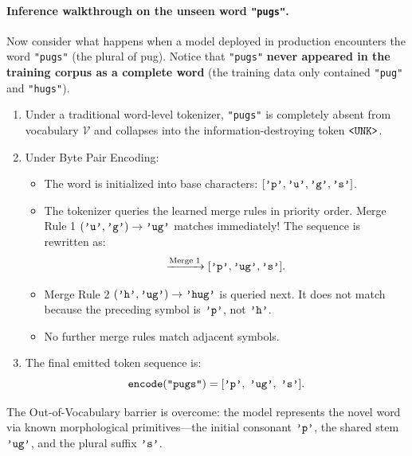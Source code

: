 \documentclass[../../main.tex]{subfiles}
\begin{document}
\paragraph{Inference walkthrough on the unseen word \texttt{"pugs"}.}
Now consider what happens when a model deployed in production encounters the word \texttt{"pugs"} (the plural of pug).
Notice that \texttt{"pugs"} \textbf{never appeared in the training corpus as a complete word} (the training data only contained \texttt{"pug"} and \texttt{"hugs"}).
\begin{enumerate}
    \item Under a traditional word-level tokenizer, \texttt{"pugs"} is completely absent from vocabulary $\mathcal{V}$ and collapses into the information-destroying token $\text{\texttt{<UNK>}}$.
    \item Under Byte Pair Encoding:
    \begin{itemize}
        \item The word is initialized into base characters: $[\text{\texttt{'p'}}, \text{\texttt{'u'}}, \text{\texttt{'g'}}, \text{\texttt{'s'}}]$.
        \item The tokenizer queries the learned merge rules in priority order. Merge Rule 1 $(\text{\texttt{'u'}}, \text{\texttt{'g'}}) \to \text{\texttt{'ug'}}$ matches immediately! The sequence is rewritten as:
        \begin{equation*}
        [\text{\texttt{'p'}}, \text{\texttt{'u'}}, \text{\texttt{'g'}}, \text{\texttt{'s'}}] \xrightarrow{\text{Merge 1}} [\text{\texttt{'p'}}, \text{\texttt{'ug'}}, \text{\texttt{'s'}}].
        \end{equation*}
        \item Merge Rule 2 $(\text{\texttt{'h'}}, \text{\texttt{'ug'}}) \to \text{\texttt{'hug'}}$ is queried next. It does not match because the preceding symbol is $\text{\texttt{'p'}}$, not $\text{\texttt{'h'}}$.
        \item No further merge rules match adjacent symbols.
    \end{itemize}
    \item The final emitted token sequence is:
    \begin{equation}
    \label{eq:bpe_unseen_result}
    \text{\texttt{encode}}(\text{\texttt{"pugs"}}) = [\text{\texttt{'p'}}, \; \text{\texttt{'ug'}}, \; \text{\texttt{'s'}}].
    \end{equation}
\end{enumerate}
The Out-of-Vocabulary barrier is overcome: the model represents the novel word via known morphological primitives—the initial consonant $\text{\texttt{'p'}}$, the shared stem $\text{\texttt{'ug'}}$, and the plural suffix $\text{\texttt{'s'}}$.
\end{document}
